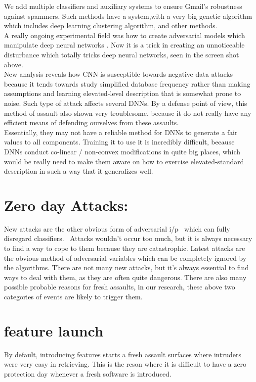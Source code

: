\documentclass[journal,twoside,web]{ieeecolor}
\begin{document}
We add multiple classifiers and auxiliary systems to ensure Gmail's robustness against spammers. Such methods have a  system,with a very big genetic algorithm which includes deep learning clustering algorithm, and other methods.\\A really ongoing experimental  field was how to create adversarial models which manipulate deep neural networks . Now it is a trick in creating an unnoticeable disturbance which totally tricks deep neural networks, seen in the screen shot above.\\
New analysis reveals how CNN is susceptible towards negative data attacks because it tends towards study simplified database frequency rather than making assumptions  and learning elevated-level description that is somewhat prone to noise.
Such type of attack affects several DNNs. By a defense point of view, this method of assault also shown very troublesome, because it do not really have any efficient means of defending ourselves from these assaults.\\
Essentially, they may not have a reliable method for DNNs to generate a fair values  to all components. Training it to use it is incredibly difficult, because DNNs conduct co-linear / non-convex modifications in quite big places, which would be really need to make them aware on how to exercise elevated-standard description in such a way that it generalizes well. \\


\section{Zero day Attacks:}
New attacks are the other obvious form of adversarial i/p  which can fully disregard classifiers.  Attacks wouldn't occur too much, but it is always necessary to find a way to cope to them because they are catastrophic.
Latest attacks are the obvious method of adversarial variables which can be completely ignored by the algorithms. There are not many new attacks, but it's always essential to find ways to deal with them, as they are often quite dangerous. There are also many possible probable reasons for fresh assaults, in our research, these above two categories of events are likely to trigger them.


\section{feature launch}
By default, introducing features starts a fresh assault surfaces where intruders were very easy in retrieving. This is the reson where it is difficult to have a zero protection day whenever a fresh software is introduced.
\end{document}
